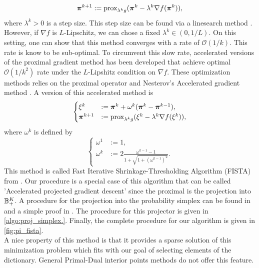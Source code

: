 \begin{equation}
    \boldsymbol \pi^{k+1} := \textnormal{prox}_{\lambda^k g}(\boldsymbol \pi^k-\lambda^k\nabla f(\boldsymbol \pi^k)),
\end{equation}
where $\lambda^k > 0$ is a step size. This step size can be found via a linesearch method \citep{Parikh:2014:PA:2693612.2693613}. However, if $\nabla f$ is $L$-Lipschitz, we can chose a fixed $\lambda^k\in (0,1/L)$. On this setting, one can show that this method converges with a rate of $\mathcal O(1/k)$. This rate is know to be sub-optimal. To circumvent this slow rate, accelerated versions of the proximal gradient method has been developed \citep{RePEc:cor:louvco:2007076}\citep{Beck:2009:FIS:1658360.1658364} that achieve optimal $\mathcal O(1/k^2)$ rate under the $L$-Lipshitz condition on $\nabla f$. These optimization methods relies on the proximal operator and Nesterov's Accelerated gradient method \citep{Nesterov:1983wy}. A version of this accelerated method is
\begin{equation*}
    \begin{cases}
    \xi^k &:= \boldsymbol \pi^k + \omega^k(\boldsymbol \pi^k-\boldsymbol \pi^{k-1}),\\
    \boldsymbol \pi^{k+1} &:= \textnormal{prox}_{\lambda^k g}(\xi^k-\lambda^k\nabla f(\xi^k)),
    \end{cases}
\end{equation*}
where $\omega^k$ is defined by
\begin{equation*}
    \begin{cases}
    \omega^1 &:= 1,   \\
    \omega^k &:= 2\frac{\omega^{k-1}-1}{1+\sqrt{1+(\omega^{k-1})^2}}.
    \end{cases}
\end{equation*}
This method is called Fast Iterative Shrinkage-Thresholding Algorithm (FISTA) from \citep{Beck:2009:FIS:1658360.1658364}. Our procedure is a special case of this algorithm that can be called 'Accelerated projected gradient descent'  since the proximal is the projection into ${\mathbb B}_+^K$. A procedure for the projection into the probability simplex can be found in \citep{Duchi:2008:EPL:1390156.1390191} and a simple proof in \citep{Wang13projectiononto}. The procedure for this projector is given in \cref{algo:proj_simplex.}. Finally, the complete procedure for our algorithm is given in \cref{fig:pi_fista}.\\ 
A nice property of this method is that it provides a sparse solution of this minimization problem which fits with our goal of selecting elements of the dictionary. General Primal-Dual interior points methods do not offer this feature.

